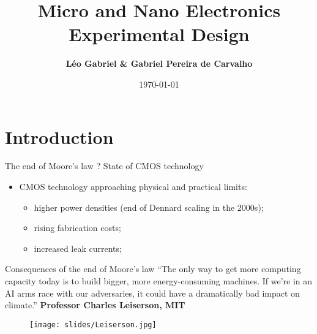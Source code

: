 \documentclass{beamer}
\title{Micro and Nano Electronics Experimental Design}
\author{\textbf{Léo Gabriel \& Gabriel Pereira de Carvalho}}
\institute{PHY\_51173\_EP \\
Professor Costel Sorin Cojocaru \\ École polytechnique}
\date{\today}
\begin{document}
\frame{\titlepage}

\section{Introduction}

\begin{frame}{The end of Moore's law ? State of CMOS technology}
\begin{itemize}
    \item CMOS technology approaching physical and practical limits:
    \begin{itemize}
        \item higher power densities (end of Dennard scaling in the 2000s);
        \item rising fabrication costs;
        \item increased leak currents;
    \end{itemize}
\end{itemize}

\begin{figure}
\end{figure}
\end{frame}

\begin{frame}{Consequences of the end of Moore's law}
“The only way to get more computing capacity today is to build bigger, more energy-consuming machines. If we’re in an AI arms race with our adversaries, it could have a dramatically bad impact on climate.” \textbf{Professor Charles Leiserson, MIT}
\begin{figure}
    \centering
    \texttt{[image: slides/Leiserson.jpg]}
    \label{fig:MIT}
\end{figure}
\end{frame}


\end{document}
